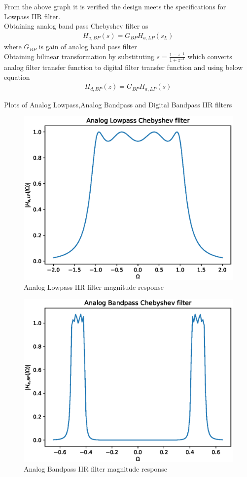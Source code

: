 \documentclass{beamer}
\begin{document}
\begin{frame}
From the above graph it is verified the design meets the specifications for Lowpass IIR filter.
\\
Obtaining analog band pass Chebyshev filter as
\begin{align}
H_{a,BP}(s) = G_{BP}H_{a,LP}(s_L)
\end{align}
where $G_{BP}$ is gain of analog band pass filter
\\
Obtaining bilinear transformation by substituting $s = \frac{1-z^{-1}}{1+z^{-1}}$ which converts analog filter transfer function to digital filter transfer function and using below equation
\begin{align}
H_{d,BP}(z)  = G_{BP}H_{a,LP}(s)
\end{align}
\end{frame}
\begin{frame}{Plots of Analog Lowpass,Analog Bandpass and Digital Bandpass IIR filters}
\begin{figure}[!h]
\includegraphics[width=0.30\columnwidth]{./figs_iir/ee18btech11034_Analog_IIR_Lowpass.eps}
\caption{Analog Lowpass IIR filter magnitude response}
\label{fig:Figure7}
\end{figure}

\begin{figure}[!h]
\includegraphics[width=0.30\columnwidth]{./figs_iir/ee18btech11034_Analog_IIR_Bandpass.eps}
\caption{Analog Bandpass IIR filter magnitude response}
\label{fig:Figure8}
\end{figure}
\end{frame}
\end{document}
